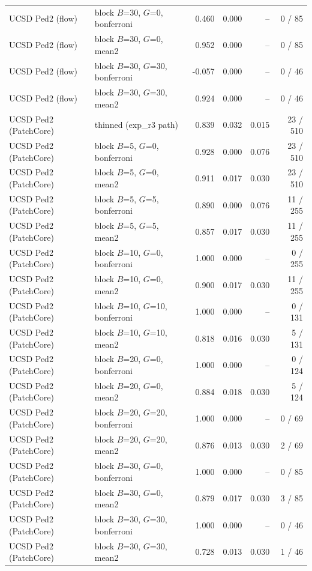 \begin{table}[t]
{\begin{tabular}{llrrrr}
UCSD Ped2 (flow) & block $B$=30, $G$=0, bonferroni & 0.460 & 0.000 & -- & 0 / 85 \\
UCSD Ped2 (flow) & block $B$=30, $G$=0, mean2 & 0.952 & 0.000 & -- & 0 / 85 \\
UCSD Ped2 (flow) & block $B$=30, $G$=30, bonferroni & -0.057 & 0.000 & -- & 0 / 46 \\
UCSD Ped2 (flow) & block $B$=30, $G$=30, mean2 & 0.924 & 0.000 & -- & 0 / 46 \\
UCSD Ped2 (PatchCore) & thinned (exp_r3 path) & 0.839 & 0.032 & 0.015 & 23 / 510 \\
UCSD Ped2 (PatchCore) & block $B$=5, $G$=0, bonferroni & 0.928 & 0.000 & 0.076 & 23 / 510 \\
UCSD Ped2 (PatchCore) & block $B$=5, $G$=0, mean2 & 0.911 & 0.017 & 0.030 & 23 / 510 \\
UCSD Ped2 (PatchCore) & block $B$=5, $G$=5, bonferroni & 0.890 & 0.000 & 0.076 & 11 / 255 \\
UCSD Ped2 (PatchCore) & block $B$=5, $G$=5, mean2 & 0.857 & 0.017 & 0.030 & 11 / 255 \\
UCSD Ped2 (PatchCore) & block $B$=10, $G$=0, bonferroni & 1.000 & 0.000 & -- & 0 / 255 \\
UCSD Ped2 (PatchCore) & block $B$=10, $G$=0, mean2 & 0.900 & 0.017 & 0.030 & 11 / 255 \\
UCSD Ped2 (PatchCore) & block $B$=10, $G$=10, bonferroni & 1.000 & 0.000 & -- & 0 / 131 \\
UCSD Ped2 (PatchCore) & block $B$=10, $G$=10, mean2 & 0.818 & 0.016 & 0.030 & 5 / 131 \\
UCSD Ped2 (PatchCore) & block $B$=20, $G$=0, bonferroni & 1.000 & 0.000 & -- & 0 / 124 \\
UCSD Ped2 (PatchCore) & block $B$=20, $G$=0, mean2 & 0.884 & 0.018 & 0.030 & 5 / 124 \\
UCSD Ped2 (PatchCore) & block $B$=20, $G$=20, bonferroni & 1.000 & 0.000 & -- & 0 / 69 \\
UCSD Ped2 (PatchCore) & block $B$=20, $G$=20, mean2 & 0.876 & 0.013 & 0.030 & 2 / 69 \\
UCSD Ped2 (PatchCore) & block $B$=30, $G$=0, bonferroni & 1.000 & 0.000 & -- & 0 / 85 \\
UCSD Ped2 (PatchCore) & block $B$=30, $G$=0, mean2 & 0.879 & 0.017 & 0.030 & 3 / 85 \\
UCSD Ped2 (PatchCore) & block $B$=30, $G$=30, bonferroni & 1.000 & 0.000 & -- & 0 / 46 \\
UCSD Ped2 (PatchCore) & block $B$=30, $G$=30, mean2 & 0.728 & 0.013 & 0.030 & 1 / 46 \\

\end{tabular}}
\end{table}
